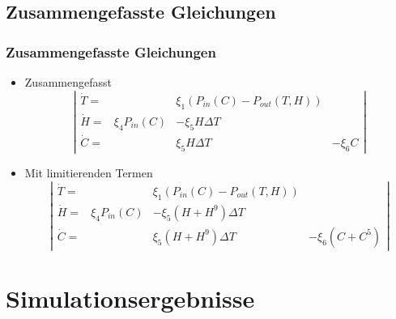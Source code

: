 \documentclass[ngerman]{beamer}
\begin{document}
\subsection{Zusammengefasste Gleichungen}

\begin{frame}
\frametitle{Zusammengefasste Gleichungen}
\begin{itemize}
	\item[] Zusammengefasst
\begin{equation}
\left|
\begin{matrix}
\dot{T} = &  & \xi_1 \left(P_{in}(C) - P_{out}(T, H) \right) &\\
\dot{H} = & \xi_4 P_{in}(C) & - \xi_5 H \Delta T & \\
\dot{C} = &                 &   \xi_5 H \Delta T & - \xi_6 C
\end{matrix}
\right|
\end{equation}
	\pause
	\item[] Mit limitierenden Termen
\begin{equation}
\left|
\begin{matrix}
\dot{T} = & & \xi_1 \left(P_{in}(C) - P_{out}(T, H) \right) &\\
\dot{H} = & \xi_4 P_{in}(C) & - \xi_5 (H + H^9) \Delta T & \\
\dot{C} = &                 &   \xi_5 (H + H^9) \Delta T & - \xi_6 (C + C^5)
\end{matrix}
\right|
\end{equation}	
	

\end{itemize}
\end{frame}

\section{Simulationsergebnisse}
\end{document}
